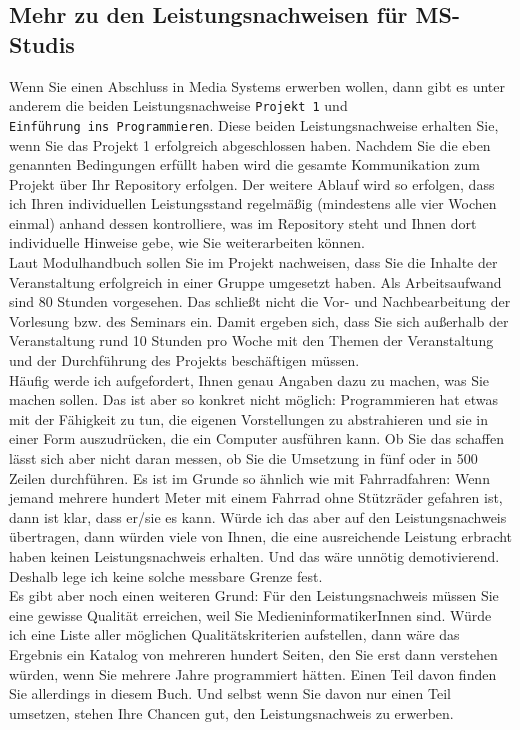 \subsection{Mehr zu den Leistungsnachweisen für MS-Studis}

Wenn Sie einen Abschluss in Media Systems erwerben wollen, dann gibt es unter anderem die beiden Leistungsnachweise \verb|Projekt 1| und\\ \verb|Einführung ins Programmieren|. Diese beiden Leistungsnachweise erhalten Sie, wenn Sie das Projekt 1 erfolgreich abgeschlossen haben. Nachdem Sie die eben genannten Bedingungen erfüllt haben wird die gesamte Kommunikation zum Projekt über Ihr Repository erfolgen. Der weitere Ablauf wird so erfolgen, dass ich Ihren individuellen Leistungsstand regelmäßig (mindestens alle vier Wochen einmal) anhand dessen kontrolliere, was im Repository steht und Ihnen dort individuelle Hinweise gebe, wie Sie weiterarbeiten können.\\

Laut Modulhandbuch sollen Sie im Projekt nachweisen, dass Sie die Inhalte der Veranstaltung erfolgreich in einer Gruppe umgesetzt haben. Als Arbeitsaufwand sind 80 Stunden vorgesehen. Das schließt nicht die Vor- und Nachbearbeitung der Vorlesung bzw. des Seminars ein. Damit ergeben sich, dass Sie sich außerhalb der Veranstaltung rund 10 Stunden pro Woche mit den Themen der Veranstaltung und der Durchführung des Projekts beschäftigen müssen.\\

Häufig werde ich aufgefordert, Ihnen genau Angaben dazu zu machen, was Sie machen sollen. Das ist aber so konkret nicht möglich: Programmieren hat etwas mit der Fähigkeit zu tun, die eigenen Vorstellungen zu abstrahieren und sie in einer Form auszudrücken, die ein Computer ausführen kann. Ob Sie das schaffen lässt sich aber nicht daran messen, ob Sie die Umsetzung in fünf oder in 500 Zeilen durchführen. Es ist im Grunde so ähnlich wie mit Fahrradfahren: Wenn jemand mehrere hundert Meter mit einem Fahrrad ohne Stützräder gefahren ist, dann ist klar, dass er/sie es kann. Würde ich das aber auf den Leistungsnachweis übertragen, dann würden viele von Ihnen, die eine ausreichende Leistung erbracht haben keinen Leistungsnachweis erhalten. Und das wäre unnötig demotivierend. Deshalb lege ich keine solche messbare Grenze fest.\\

Es gibt aber noch einen weiteren Grund: Für den Leistungsnachweis müssen Sie eine gewisse Qualität erreichen, weil Sie MedieninformatikerInnen sind. Würde ich eine Liste aller möglichen Qualitätskriterien aufstellen, dann wäre das Ergebnis ein Katalog von mehreren hundert Seiten, den Sie erst dann verstehen würden, wenn Sie mehrere Jahre programmiert hätten. Einen Teil davon finden Sie allerdings in diesem Buch. Und selbst wenn Sie davon nur einen Teil umsetzen, stehen Ihre Chancen gut, den Leistungsnachweis zu erwerben.

